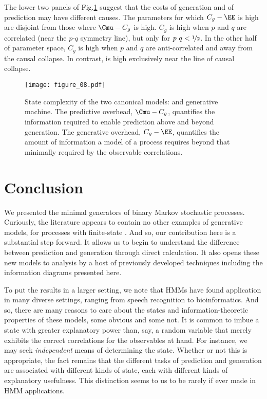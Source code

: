 \documentclass[final,nofootinbib,aps,pre,twocolumn,showpacs,groupaddress,preprintnumbers,floatfix]{revtex4-1}
\newcommand{\Cg}{\ensuremath{C_g}\xspace}
\begin{document}
The lower two panels of Fig.\nobreakspace \ref {fig:cmu_cg} suggest that the costs of generation
and of prediction may have different causes. The parameters for which $\Cg -
\EE$ is high are disjoint from those where $\Cmu - \Cg$ is high.  \Cg is high
when $p$ and $q$ are correlated (near the $p$-$q$ symmetry line), but only for
$p ~ q < \nicefrac{1}{2}$. In the other half of parameter space, \Cg is high
when $p$ and $q$ are anti-correlated and away from the causal collapse. In
contrast, \Cmu is high exclusively near the line of causal collapse.

\begin{figure}
\centering
\texttt{[image: figure\_08.pdf]}
 \caption{State complexity of the two canonical models: \eM and generative
	machine. The predictive overhead, $\Cmu - \Cg$, quantifies the information
	required to enable prediction above and beyond generation. The generative
	overhead, $\Cg - \EE$, quantifies the amount of information a model of a
	process requires beyond that minimally required by the observable
	correlations.
  }
\label{fig:cmu_cg}
\end{figure}

\section{Conclusion}
\label{sec:conclusion}

We presented the minimal generators of binary Markov stochastic processes.
Curiously, the literature appears to contain no other examples of generative
models, for processes with finite-state \eMs. And so, our contribution here is
a substantial step forward. It allows us to begin to understand the difference
between prediction and generation through direct calculation. It also opens
these new models to analysis by a host of previously developed techniques
including the information diagrams presented here.

To put the results in a larger setting, we note that HMMs have found
application in many diverse settings, ranging from speech recognition to
bioinformatics. And so, there are many reasons to care about the states and
information-theoretic properties of these models, some obvious and some not.
It is common to imbue a state with greater explanatory power than, say, a
random variable that merely exhibits the correct correlations for the
observables at hand. For instance, we may seek \emph{independent} means of
determining the state. Whether or not this is appropriate, the fact remains
that the different tasks of prediction and generation are associated with
different kinds of state, each with different kinds of explanatory usefulness.
This distinction seems to us to be rarely if ever made in HMM applications.
\end{document}
